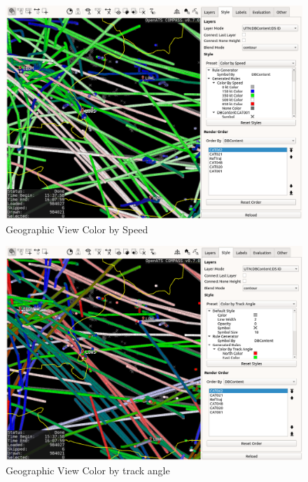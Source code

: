 \begin{figure}[H]
    \hspace*{-2.5cm}
    \includegraphics[width=19cm,frame]{figures/geoview_style_speed.png}
  \caption{Geographic View Color by Speed}
\end{figure}

\begin{figure}[H]
    \hspace*{-2.5cm}
    \includegraphics[width=19cm,frame]{figures/geoview_style_track_angle.png}
  \caption{Geographic View Color by track angle}
\end{figure}

